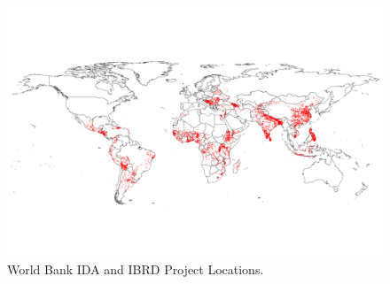 \documentclass[sustainability,article,submit,moreauthors,pdftex,10pt,a4paper]{mdpi}
\begin{document}
\begin{figure}[H]
\centering
\includegraphics[width=1\textwidth, trim=0cm 6cm 0cm 2cm]{WLocs.png}
\caption{World Bank IDA and IBRD Project Locations.}
\label{WBLocs}
\end{figure}  
\end{document}
